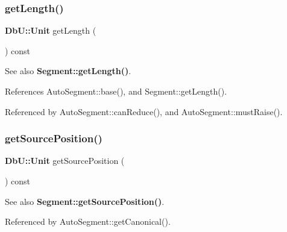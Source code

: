 \mbox{\label{classKatabatic_1_1AutoSegment_ab1ca7adfc68761c749a16f65c9aa4088}} 
\subsubsection{\texorpdfstring{get\+Length()}{getLength()}}
{\footnotesize\ttfamily \textbf{ Db\+U\+::\+Unit} get\+Length (\begin{DoxyParamCaption}{ }\end{DoxyParamCaption}) const\hspace{0.3cm}{\ttfamily [inline]}}

\begin{DoxySeeAlso}{See also}
\textbf{ Segment\+::get\+Length()}. 
\end{DoxySeeAlso}


References Auto\+Segment\+::base(), and Segment\+::get\+Length().



Referenced by Auto\+Segment\+::can\+Reduce(), and Auto\+Segment\+::must\+Raise().

\mbox{\label{classKatabatic_1_1AutoSegment_a8a88dc051a8d324aff8763609957dcaa}} 
\subsubsection{\texorpdfstring{get\+Source\+Position()}{getSourcePosition()}}
{\footnotesize\ttfamily \textbf{ Db\+U\+::\+Unit} get\+Source\+Position (\begin{DoxyParamCaption}{ }\end{DoxyParamCaption}) const\hspace{0.3cm}{\ttfamily [inline]}}

\begin{DoxySeeAlso}{See also}
\textbf{ Segment\+::get\+Source\+Position()}. 
\end{DoxySeeAlso}


Referenced by Auto\+Segment\+::get\+Canonical().

